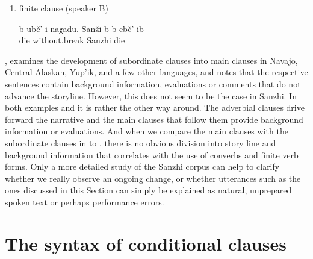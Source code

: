 \begin{enumerate}
	\item	finite clause (speaker B)
	\begin{exe}
		\ex	\label{ex:‎They died without stopping, in Sanzhi (people) died}
		\gll	b-ubč'-i	naχadu.	Sanži-b	b-ebč'-ib\\
			die	without.break	Sanzhi	die\\
		\glt	{}
	\end{exe}
\end{enumerate}

\citet{Mithun2008}, examines the development of subordinate clauses into main clauses in Navajo, Central Alaskan, Yup'ik, and a few other languages, and notes that the respective sentences contain background information, evaluations or comments that do not advance the storyline. However, this does not seem to be the case in Sanzhi. In both examples  and  it is rather the other way around. The adverbial clauses drive forward the narrative and the main clauses that follow them provide background information or evaluations. And when we compare the main clauses with the subordinate clauses in  to , there is no obvious division into story line and background information that correlates with the use of converbs and finite verb forms. Only a more detailed study of the Sanzhi corpus can help to clarify whether we really observe an ongoing change, or whether utterances such as the ones discussed in this Section can simply be explained as natural, unprepared spoken text or perhaps performance errors.



\section{The syntax of conditional clauses}
\label{sec:The syntax of conditional clauses}


